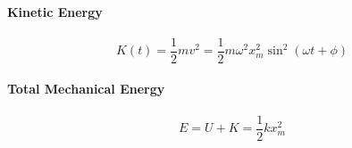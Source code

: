 \documentclass{article}
\begin{document}
        \paragraph{Kinetic Energy}
        \begin{equation}
            K(t) = \frac{1}{2} m v^2 = \frac{1}{2} m \omega^2 x_m^2 \sin^2 \left( \omega t + \phi \right)
        \end{equation}

        \paragraph{Total Mechanical Energy}
        \begin{equation}
            E = U + K = \frac{1}{2} k x_m^2
        \end{equation}
\end{document}
